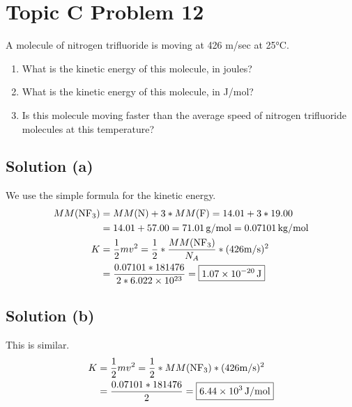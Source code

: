 \documentclass[10pt]{article}
\newcommand{\E}[1]{\times 10^{#1}}
\begin{document}
    \pagebreak
    \section{Topic C Problem 12}
        A molecule of nitrogen trifluoride is moving at 426 m/sec at 25\unit{\celsius}.
        \begin{enumerate} [label=\alph*)]
            \item What is the kinetic energy of this molecule, in joules?
            \item What is the kinetic energy of this molecule, in J/mol?
            \item Is this molecule moving faster than the average speed of nitrogen trifluoride molecules at this temperature?
        \end{enumerate}

        \subsection{Solution (a)}
            We use the simple formula for the kinetic energy. 
            \begin{align}
                MM(\ce{NF3})   &=  MM(\ce{N}) + 3 * MM(\ce{F})
                    =   14.01 + 3 * 19.00\\
                    &=  14.01 + 57.00
                    =   71.01\,\unit{\gram/\mole}
                    =   0.07101\,\unit{\kilo\gram/\mole}\\
                K   &=  \frac{1}{2}mv^2
                    =   \frac{1}{2} * \frac{MM(\ce{NF3})}{N_A} * (426\unit{\meter/\second})^2\\
                    &=  \frac{0.07101 * 181476}{2 * 6.022\E{23}}
                    =   \boxed{1.07\E{-20}\,\unit{\joule}}
            \end{align}

        \subsection{Solution (b)}
            This is similar.
            \begin{align}
                K   &=  \frac{1}{2}mv^2
                    =   \frac{1}{2} * MM(\ce{NF3}) * (426\unit{\meter/\second})^2\\
                    &=  \frac{0.07101 * 181476}{2}
                    =   \boxed{6.44\E{3}\,\unit{\joule/\mole}}
            \end{align}
\end{document}
